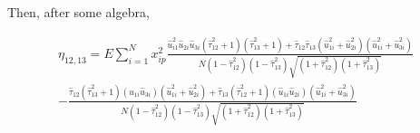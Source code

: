 \documentclass[aoas,preprint]{imsart}
\numberwithin{equation}{section}
\theoremstyle{plain}
\begin{document}
 Then, after some algebra,

\begin{equation}
    \begin{multlined}
    \eta_{12,13} = E\sum_{i=1}^{N}x_{ip}^2  \frac{\hat{u}_{i1}^2 \hat{u}_{2i}\hat{u}_{3i}(\hat{\tau}_{12}^2+1)(\hat{\tau}_{13}^2+1)
    + \hat{\tau}_{12}\hat{\tau}_{13} (\hat{u}_{1i}^2 + \hat{u}_{2i}^2)(\hat{u}_{1i}^2 + \hat{u}_{3i}^2)}{N(1-\hat{\tau}_{12}^2)(1-\hat{\tau}_{13}^2)\sqrt{(1+\hat{\tau}_{12}^2)(1+\hat{\tau}_{13}^2)}} \\
    - \frac{\hat{\tau}_{12}(\hat{\tau}_{13}^2 + 1) (\hat{u}_{1i}\hat{u}_{3i})(\hat{u}_{1i}^2 + \hat{u}_{2i}^2) + \hat{\tau}_{13}(\hat{\tau}_{12}^2+1)(\hat{u}_{1i}\hat{u}_{2i})(\hat{u}_{1i}^2 + \hat{u}_{3i}^2)}{N(1-\hat{\tau}_{12}^2)(1-\hat{\tau}_{13}^2)\sqrt{(1+\hat{\tau}_{12}^2)(1+\hat{\tau}_{13}^2)}}
    \end{multlined} 
    \end{equation}
\end{document}
